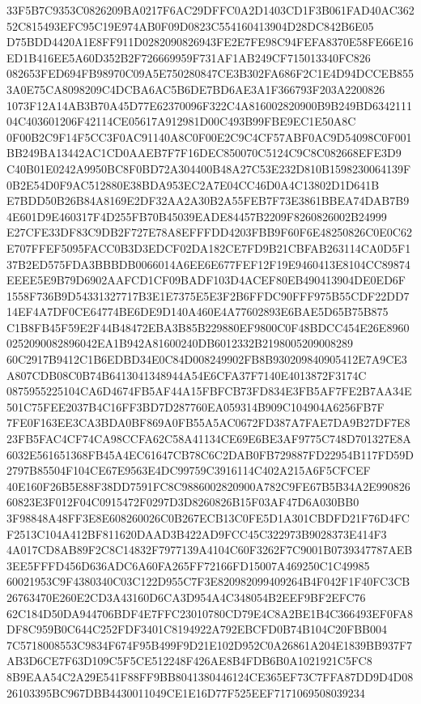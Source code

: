 \documentclass[UTF8,fontset=fandol,zihao=-4,a4paper]{ctexart}
\begin{document}
{{33F5B7C9353C0826209BA0217F6AC29DFFC0A2D1403CD1F3B061FAD40AC36252C815493EFC95C19E974AB0F09D0823C554160413904D28DC842B6E05
D75BDD4420A1E8FF911D0282090826943FE2E7FE98C94FEFA8370E58FE66E16ED1B416EE5A60D352B2F726669959F731AF1AB249CF715013340FC826
082653FED694FB98970C09A5E750280847CE3B302FA686F2C1E4D94DCCEB8553A0E75CA8098209C4DCBA6AC5B6DE7BD6AE3A1F366793F203A2200826
1073F12A14AB3B70A45D77E62370096F322C4A816002820900B9B249BD634211104C403601206F42114CE05617A912981D00C493B99FBE9EC1E50A8C
0F00B2C9F14F5CC3F0AC91140A8C0F00E2C9C4CF57ABF0AC9D54098C0F001BB249BA13442AC1CD0AAEB7F7F16DEC850070C5124C9C8C082668EFE3D9
C40B01E0242A9950BC8F0BD72A304400B48A27C53E232D810B1598230064139F0B2E54D0F9AC512880E38BDA953EC2A7E04CC46D0A4C13802D1D641B
E7BDD50B26B84A8169E2DF32AA2A30B2A55FEB7F73E3861BBEA74DAB7B94E601D9E460317F4D255FB70B45039EADE84457B2209F8260826002B24999
E27CFE33DF83C9DB2F727E78A8EFFFDD4203FBB9F60F6E48250826C0E0C62E707FFEF5095FACC0B3D3EDCF02DA182CE7FD9B21CBFAB263114CA0D5F1
37B2ED575FDA3BBBDB0066014A6EE6E677FEF12F19E9460413E8104CC89874EEEE5E9B79D6902AAFCD1CF09BADF103D4ACEF80EB490413904DE0ED6F
1558F736B9D54331327717B3E1E7375E5E3F2B6FFDC90FFF975B55CDF22DD714EF4A7DF0CE64774BE6DE9D140A460E4A77602893E6BAE5D65B75B875
C1B8FB45F59E2F44B48472EBA3B85B229880EF9800C0F48BDCC454E26E89600252090082896042EA1B942A81600240DB6012332B2198005209008289
60C2917B9412C1B6EDBD34E0C84D008249902FB8B930209840905412E7A9CE3A807CDB08C0B74B6413041348944A54E6CFA37F7140E4013872F3174C
0875955225104CA6D4674FB5AF44A15FBFCB73FD834E3FB5AF7FE2B7AA34E501C75FEE2037B4C16FF3BD7D287760EA059314B909C104904A6256FB7F
7FE0F163EE3CA3BDA0BF869A0FB55A5AC0672FD387A7FAE7DA9B27DF7E823FB5FAC4CF74CA98CCFA62C58A41134CE69E6BE3AF9775C748D701327E8A
6032E561651368FB45A4EC61647CB78C6C2DAB0FB729887FD22954B117FD59D2797B85504F104CE67E9563E4DC99759C3916114C402A215A6F5CFCEF
40E160F26B5E88F38DD7591FC8C9886002820900A782C9FE67B5B34A2E99082660823E3F012F04C0915472F0297D3D8260826B15F03AF47D6A030BB0
3F98848A48FF3E8E608260026C0B267ECB13C0FE5D1A301CBDFD21F76D4FCF2513C104A412BF811620DAAD3B422AD9FCC45C322973B9028373E414F3
4A017CD8AB89F2C8C14832F7977139A4104C60F3262F7C9001B0739347787AEB3EE5FFFD456D636ADC6A60FA265FF72166FD15007A469250C1C49985
60021953C9F4380340C03C122D955C7F3E820982099409264B4F042F1F40FC3CB26763470E260E2CD3A43160D6CA3D954A4C348054B2EEF9BF2EFC76
62C184D50DA944706BDF4E7FFC23010780CD79E4C8A2BE1B4C366493EF0FA8DF8C959B0C644C252FDF3401C8194922A792EBCFD0B74B104C20FBB004
7C5718008553C9834F674F95B499F9D21E102D952C0A26861A204E1839BB937F7AB3D6CE7F63D109C5F5CE512248F426AE8B4FDB6B0A1021921C5FC8
8B9EAA54C2A29E541F88FF9BB8041380446124CE365EF73C7FFA87DD9D4D0826103395BC967DBB4430011049CE1E16D77F525EEF7171069508039234
}}
\end{document}
